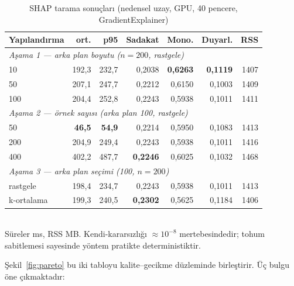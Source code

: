 \documentclass[conference]{IEEEtran}
\begin{document}
\begin{table}[t]
\caption{SHAP tarama sonuçları (nedensel uzay, GPU, 40 pencere,
GradientExplainer)}
\label{tab:shap-sweep}
\centering
\scriptsize
\begin{tabular}{lrrrrrr}
\toprule
\textbf{Yapılandırma} & \textbf{ort.} & \textbf{p95} & \textbf{Sadakat} & \textbf{Mono.} & \textbf{Duyarl.} & \textbf{RSS}\\
\midrule
\multicolumn{7}{l}{\emph{Aşama 1 --- arka plan boyutu ($n{=}200$, rastgele)}}\\
10   & 192{,}3 & 232{,}7 & 0{,}2038 & \textbf{0{,}6263} & \textbf{0{,}1119} & 1407\\
50   & 207{,}1 & 247{,}7 & 0{,}2212 & 0{,}6150 & 0{,}1003 & 1409\\
100  & 204{,}4 & 252{,}8 & 0{,}2243 & 0{,}5938 & 0{,}1011 & 1411\\
\midrule
\multicolumn{7}{l}{\emph{Aşama 2 --- örnek sayısı (arka plan 100, rastgele)}}\\
50   & \textbf{46{,}5} & \textbf{54{,}9} & 0{,}2214 & 0{,}5950 & 0{,}1083 & 1413\\
200  & 204{,}9 & 249{,}4 & 0{,}2243 & 0{,}5938 & 0{,}1011 & 1416\\
400  & 402{,}2 & 487{,}7 & \textbf{0{,}2246} & 0{,}6025 & 0{,}1032 & 1468\\
\midrule
\multicolumn{7}{l}{\emph{Aşama 3 --- arka plan seçimi (100, $n{=}200$)}}\\
rastgele    & 198{,}4 & 234{,}7 & 0{,}2243 & 0{,}5938 & 0{,}1011 & 1413\\
k-ortalama  & 199{,}3 & 240{,}5 & \textbf{0{,}2302} & 0{,}5625 & 0{,}1184 & 1406\\
\bottomrule
\end{tabular}
\\[2pt]
\footnotesize Süreler ms, RSS MB. Kendi-kararsızlığı $\approx 10^{-8}$
mertebesindedir; tohum sabitlemesi sayesinde yöntem pratikte deterministiktir.
\end{table}

Şekil~\ref{fig:pareto} bu iki tabloyu kalite--gecikme düzleminde birleştirir.
Üç bulgu öne çıkmaktadır:
\end{document}
